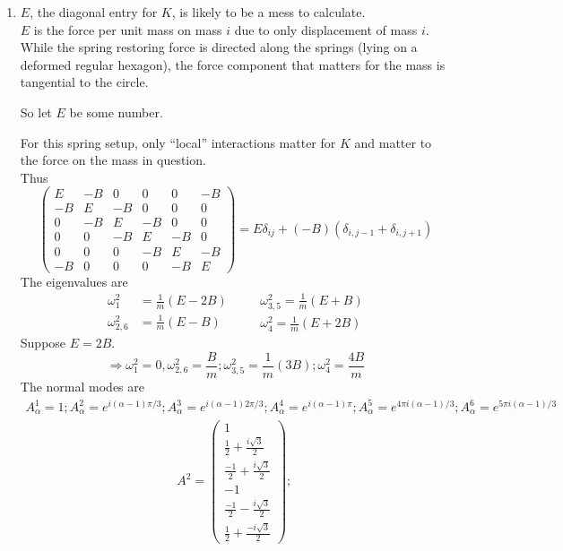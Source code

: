 \documentclass[twoside,10pt]{amsart}
\newcommand{\problemhead}[1]
  {\smallskip
   \noindent{\large\bf Problem #1.}
   \smallskip}
\begin{document}
\problemhead{4.2}
\begin{enumerate}
\item $E$, the diagonal entry for $K$, is likely to be a mess to calculate.  \smallskip \\
  $E$ is the force per unit mass on mass $i$ due to only displacement of mass $i$.  While the spring restoring force is directed along the springs (lying on a deformed regular hexagon), the force component that matters for the mass is tangential to the circle.  

So let $E$ be some number.  

For this spring setup, only ``local'' interactions matter for $K$ and matter to the force on the mass in question.  \\
Thus
\begin{equation}
\left( \begin{matrix} 
  E & -B & 0 & 0 & 0 & -B  \\
  -B & E & -B & 0 & 0 & 0 \\
  0 & -B & E & -B & 0 & 0 \\
  0 & 0 & -B & E & -B & 0  \\
  0 & 0 & 0 & -B & E & -B \\
  -B & 0 & 0 & 0 & -B & E 
\end{matrix} \right) = E \delta_{ij} + (-B) (\delta_{i,j-1} + \delta_{i,j+1} )
\end{equation}
The eigenvalues are
\[
\begin{aligned}
\omega_1^2 & = \frac{1}{m} ( E - 2 B )  \\
\omega_{2,6}^2 &= \frac{1}{m} (E-B)  
\end{aligned} \quad 
\begin{aligned}
  & \omega_{3,5}^2 = \frac{1}{m} (E+B)  \\
  & \omega_4^2 = \frac{1}{m} (E + 2B) 
\end{aligned}
\]
Suppose $E=2B$.  
\[
\Longrightarrow \omega_1^2 =0, \omega_{2,6}^2 = \frac{B}{m}; \omega_{3,5}^2 = \frac{1}{m} (3B); \omega_4^2 = \frac{ 4B}{m}
\]
The normal modes are
\[
\begin{gathered}
A_{\alpha}^1 = 1; A_{\alpha}^2 = e^{i (\alpha -1) \pi/3 }; A_{\alpha}^3 = e^{i(\alpha - 1) 2 \pi/3}; A_{\alpha}^4 = e^{i(\alpha - 1) \pi }; A_{\alpha}^5 = e^{4\pi i (\alpha- 1)/3}; A_{\alpha}^6 = e^{5 \pi i (\alpha -1 )/3 }  
\end{gathered}
\]
\[
\begin{gathered}
A^2 = \left( \begin{matrix} 1 \\ \frac{1}{2} + \frac{ i \sqrt{3}}{2}  \\  \frac{-1}{2} + \frac{ i \sqrt{3}}{2}   \\ -1 \\  \frac{-1}{2} - \frac{ i \sqrt{3}}{2}  \\  \frac{1}{2} + \frac{ -i \sqrt{3}}{2}  \end{matrix} \right); \, 

\end{gathered}\]
\end{enumerate}
\end{document}
